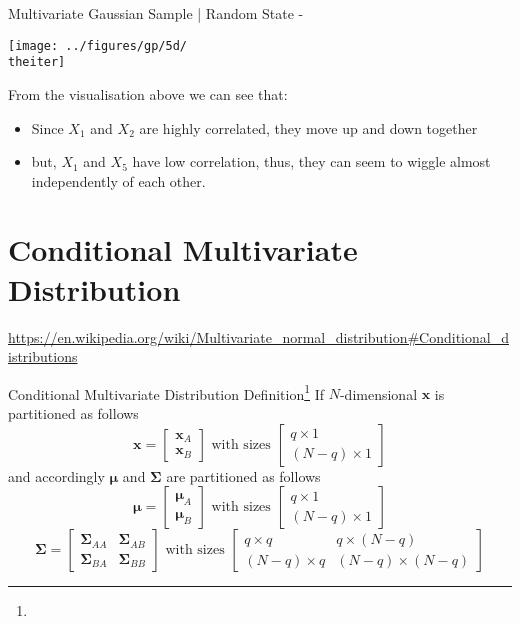 \documentclass{beamer}
\begin{document}
	{%
		\begin{frame}{Multivariate Gaussian Sample | Random State - \theiter}
			\begin{center}
				\texttt{[image: ../figures/gp/5d/\\theiter]}
			\end{center}
			From the visualisation above we can see that:
			\begin{itemize}
				\item Since $X_1$ and $X_2$ are highly correlated, they move up and down together
				\item but, $X_1$ and $X_5$ have low correlation, thus, they can seem to wiggle almost independently of each other.
			\end{itemize}
		\end{frame}
	}
	
	\section{Conditional Multivariate Distribution}
	
	
	\urldef\urlwik\url{https://en.wikipedia.org/wiki/Multivariate\_normal\_distribution#Conditional\_distributions}
	
	\label{sec:condMul}
	\begin{frame}{Conditional Multivariate Distribution Definition\footnote{\urlwik}}
		If $N$-dimensional $\mathbf{x}$ is partitioned as follows
		$$\mathbf{x}
		=
		\begin{bmatrix}
		\mathbf{x}_A \\
		\mathbf{x}_B
		\end{bmatrix}
		\text{ with sizes }\begin{bmatrix} q \times 1 \\ (N-q) \times 1 \end{bmatrix}$$
		and accordingly $\mathbf{\mu}$ and $\mathbf{\Sigma}$ are partitioned as follows
		$$\boldsymbol\mu
		=
		\begin{bmatrix}
		\boldsymbol\mu_A \\
		\boldsymbol\mu_B
		\end{bmatrix}
		\text{ with sizes }\begin{bmatrix} q \times 1 \\ (N-q) \times 1 \end{bmatrix}$$
		$$\boldsymbol\Sigma
		=
		\begin{bmatrix}
		\boldsymbol\Sigma_{AA} & \boldsymbol\Sigma_{AB} \\
		\boldsymbol\Sigma_{BA} & \boldsymbol\Sigma_{BB}
		\end{bmatrix}
		\text{ with sizes }\begin{bmatrix} q \times q & q \times (N-q) \\ (N-q) \times q & (N-q) \times (N-q) \end{bmatrix}$$	
	\end{frame}
	
\end{document}

